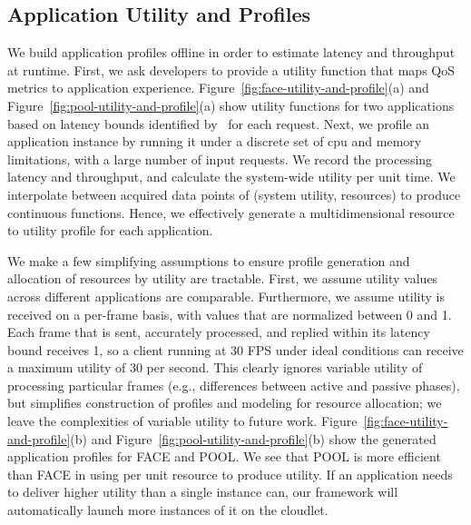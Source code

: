 \subsection{Application Utility and Profiles}

We build application profiles offline in order to estimate latency and
throughput at runtime. First, we ask developers to provide a utility
function that maps QoS metrics to application experience.
Figure~\ref{fig:face-utility-and-profile}(a) and
Figure~\ref{fig:pool-utility-and-profile}(a) show utility functions
for two applications based on latency bounds identified
by~\cite{chen2017empirical} for each request. Next, we profile an application
instance by running it under a discrete set of cpu and memory
limitations, with a large number of input requests. We record the
processing latency and throughput, and calculate the system-wide
utility per unit time. We interpolate between acquired data points of
(system utility, resources) to produce continuous functions.  Hence,
we effectively generate a multidimensional resource to utility profile
for each application.

We make a few simplifying assumptions to ensure profile generation and
allocation of resources by utility are tractable.  First, we assume
utility values across different applications are comparable.
Furthermore, we assume utility is received on a per-frame basis, with
values that are normalized between 0 and 1.  Each frame that is sent,
accurately processed, and replied within its latency bound receives 1,
so a client running at 30 FPS under ideal conditions can receive a
maximum utility of 30 per second.  This clearly ignores variable
utility of processing particular frames (e.g., differences between
active and passive phases), but simplifies construction of profiles
and modeling for resource allocation; we leave the complexities of
variable utility to future work.
Figure~\ref{fig:face-utility-and-profile}(b) and
Figure~\ref{fig:pool-utility-and-profile}(b) show the generated
application profiles for FACE and POOL. We see that POOL is more efficient
than FACE in using per unit resource to produce utility. If an
application needs to deliver higher utility than a single instance
can, our framework will automatically launch more instances of it on
the cloudlet.
